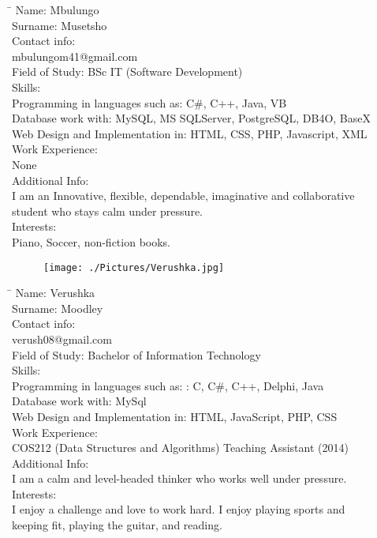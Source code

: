 \documentclass[12pt]{article}
\begin{document}
	\begin{tabbing}
		\hspace*{3.5cm}\=\hspace*{3cm} \kill
		Name: \> Mbulungo \\
		Surname: \> Musetsho \\
		Contact info:  \\
			\> mbulungom41@gmail.com \\
		Field of Study: \> BSc IT (Software Development) \\
		Skills: \\
			\> Programming in languages such as: C\#, C++, Java, VB \\
			\> Database work with: MySQL, MS SQLServer, PostgreSQL, DB4O, BaseX \\
			\> Web Design and Implementation in: HTML, CSS, PHP, Javascript, XML \\
		Work Experience: \\
			\> None \\
		Additional Info: \\
			\> I am an Innovative,  flexible, dependable, imaginative and collaborative \\ \> student who stays calm under pressure.\\
		Interests: \\
			\> Piano, Soccer, non-fiction books. \\
	\end{tabbing}

	\newpage 
	\begin{figure}[ht!]
		\centering
		\texttt{[image: ./Pictures/Verushka.jpg]}
	\end{figure}
	
	\begin{tabbing}
		\hspace*{3.5cm}\=\hspace*{3cm} \kill
		Name: \> Verushka \\
		Surname: \> Moodley \\
		Contact info: \>  0832606845 \\
			\>	verush08@gmail.com \\
		Field of Study: \> Bachelor of Information Technology \\
		Skills: \\
			\> Programming in languages such as: : C, C\#, C++, Delphi, Java \\
			\> Database work with: MySql \\
			\> Web Design and Implementation in: HTML, JavaScript, PHP, CSS  \\
		Work Experience: \\
			\> COS212 (Data Structures and Algorithms) Teaching Assistant (2014) \\
		Additional Info: \\
			\>	I am a calm and level-headed thinker who works well under pressure. \\
		Interests:  \\
			\> I enjoy a challenge and love to work hard. I enjoy playing sports and \\ \> keeping fit, playing the guitar, and reading.	
	\end{tabbing}
\end{document}
